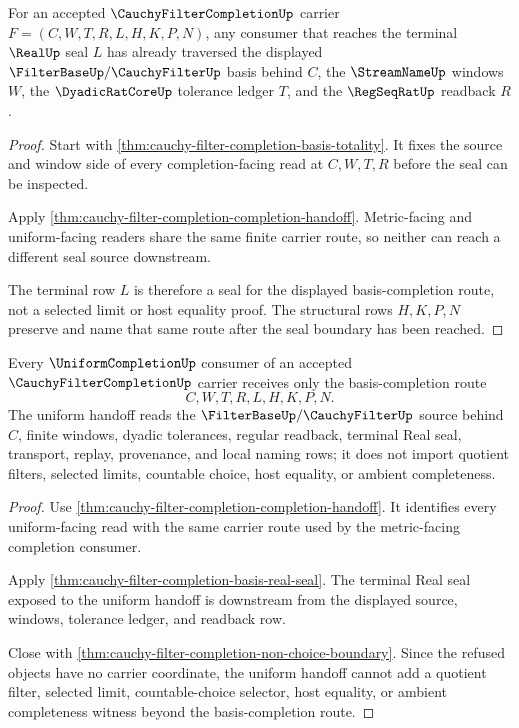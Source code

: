 \begin{theorem}
\label{thm:cauchy-filter-completion-basis-real-seal}
For an accepted $\CauchyFilterCompletionUp$ carrier $F=(C,W,T,R,L,H,K,P,N)$, any consumer that reaches the terminal $\RealUp$ seal $L$ has already traversed the displayed $\FilterBaseUp/\CauchyFilterUp$ basis behind $C$, the $\StreamNameUp$ windows $W$, the $\DyadicRatCoreUp$ tolerance ledger $T$, and the $\RegSeqRatUp$ readback $R$.
\end{theorem}
\begin{proof}
Start with \autoref{thm:cauchy-filter-completion-basis-totality}. It fixes the source and window side of every completion-facing read at $C,W,T,R$ before the seal can be inspected.

Apply \autoref{thm:cauchy-filter-completion-completion-handoff}. Metric-facing and uniform-facing readers share the same finite carrier route, so neither can reach a different seal source downstream.

The terminal row $L$ is therefore a seal for the displayed basis-completion route, not a selected limit or host equality proof. The structural rows $H,K,P,N$ preserve and name that same route after the seal boundary has been reached.
\end{proof}

\begin{theorem}
\label{thm:cauchy-filter-completion-basis-uniform-handoff}
Every $\UniformCompletionUp$ consumer of an accepted $\CauchyFilterCompletionUp$ carrier receives only the basis-completion route
$$
C,W,T,R,L,H,K,P,N .
$$
The uniform handoff reads the $\FilterBaseUp/\CauchyFilterUp$ source behind $C$, finite windows, dyadic tolerances, regular readback, terminal Real seal, transport, replay, provenance, and local naming rows; it does not import quotient filters, selected limits, countable choice, host equality, or ambient completeness.
\end{theorem}
\begin{proof}
Use \autoref{thm:cauchy-filter-completion-completion-handoff}. It identifies every uniform-facing read with the same carrier route used by the metric-facing completion consumer.

Apply \autoref{thm:cauchy-filter-completion-basis-real-seal}. The terminal Real seal exposed to the uniform handoff is downstream from the displayed source, windows, tolerance ledger, and readback row.

Close with \autoref{thm:cauchy-filter-completion-non-choice-boundary}. Since the refused objects have no carrier coordinate, the uniform handoff cannot add a quotient filter, selected limit, countable-choice selector, host equality, or ambient completeness witness beyond the basis-completion route.
\end{proof}

